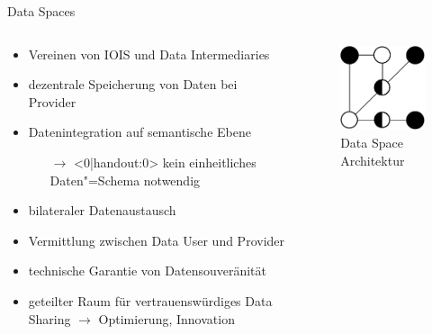 \begin{frame}{Data Spaces \footnotesize\cite{mollerIndustrialDataEcosystems2024}}
    \begin{columns}
        \begin{column}{0.6\textwidth}
            \begin{itemize}
                \item Vereinen von IOIS und Data Intermediaries
                \item dezentrale Speicherung von Daten bei Provider
                
                \item<0|handout:0> Datenintegration auf semantische Ebene
                \begin{itemize}
                    \item[$\to$]<0|handout:0> kein einheitliches Daten"=Schema notwendig
                \end{itemize}
                \item<0|handout:0> bilateraler Datenaustausch
                \item<0|handout:0> Vermittlung zwischen Data User und Provider
                \item<0|handout:0> technische Garantie von Datensouveränität
                \item<0|handout:0> geteilter Raum für vertrauenswürdiges Data Sharing $\to$ Optimierung, Innovation
            \end{itemize}
        \end{column}
        
        \begin{column}{0.4\textwidth}
            \begin{figure}
                \includegraphics[height=0.5\textheight]{./assets/data_space_architecture.drawio.pdf}
                \caption{Data Space Architektur}
            \end{figure}
        \end{column}
    \end{columns}
\end{frame}


